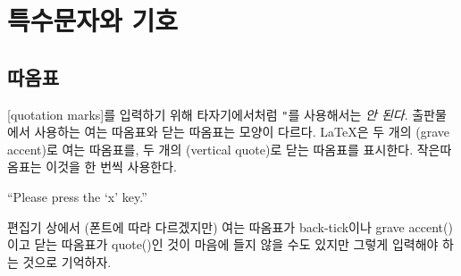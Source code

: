 \section{특수문자와 기호}

\subsection{따옴표}

[quotation marks]를 입력하기 위해 타자기에서처럼 \verb|"|를 사용해서는 \emph{안 된다}.
출판물에서 사용하는 여는 따옴표와 닫는 따옴표는 모양이 다르다. \LaTeX 은 두 개의 \textasciigrave (grave accent)로 여는 따옴표를,
두 개의 \textquotesingle (vertical quote)로 닫는 따옴표를 표시한다. 작은따옴표는 이것을 한 번씩 사용한다.
\begin{example}
``Please press the `x' key.''
\end{example}
편집기 상에서 (폰트에 따라 다르겠지만) 여는 따옴표가 back-tick이나 grave accent(\textasciigrave)이고 닫는 따옴표가 quote(\textquotesingle)인 것이
마음에 들지 않을 수도 있지만 그렇게 입력해야 하는 것으로 기억하자.%


